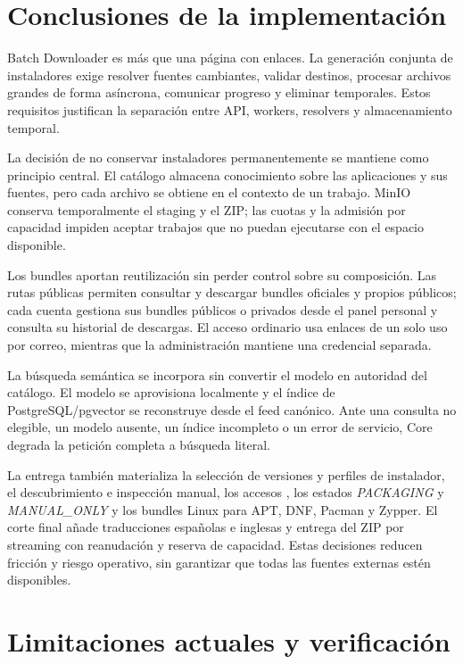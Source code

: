 
\section{Conclusiones de la implementación}

Batch Downloader es más que una página con enlaces. La generación conjunta de instaladores exige resolver fuentes cambiantes, validar destinos, procesar archivos grandes de forma asíncrona, comunicar progreso y eliminar temporales. Estos requisitos justifican la separación entre API, workers, resolvers y almacenamiento temporal.

La decisión de no conservar instaladores permanentemente se mantiene como principio central. El catálogo almacena conocimiento sobre las aplicaciones y sus fuentes, pero cada archivo se obtiene en el contexto de un trabajo. MinIO conserva temporalmente el staging y el ZIP; las cuotas y la admisión por capacidad impiden aceptar trabajos que no puedan ejecutarse con el espacio disponible.

Los bundles aportan reutilización sin perder control sobre su composición. Las rutas públicas permiten consultar y descargar bundles oficiales y propios públicos; cada cuenta gestiona sus bundles públicos o privados desde el panel personal y consulta su historial de descargas. El acceso ordinario usa enlaces de un solo uso por correo, mientras que la administración mantiene una credencial separada.

La búsqueda semántica se incorpora sin convertir el modelo en autoridad del catálogo. El modelo se aprovisiona localmente y el índice de PostgreSQL/pgvector se reconstruye desde el feed canónico. Ante una consulta no elegible, un modelo ausente, un índice incompleto o un error de servicio, Core degrada la petición completa a búsqueda literal.

La entrega también materializa la selección de versiones y perfiles de instalador, el descubrimiento e inspección manual, los accesos , los estados \emph{PACKAGING} y \emph{MANUAL\_ONLY} y los bundles Linux para APT, DNF, Pacman y Zypper. El corte final añade traducciones españolas e inglesas y entrega del ZIP por streaming con reanudación y reserva de capacidad. Estas decisiones reducen fricción y riesgo operativo, sin garantizar que todas las fuentes externas estén disponibles.

\section{Limitaciones actuales y verificación}

